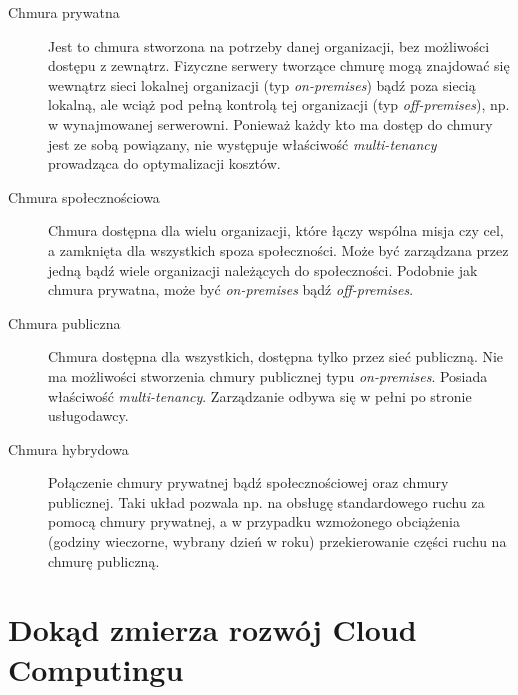 \documentclass[12pt,a4paper,twoside,titlepage,openright]{book}
\begin{document}
\begin{description}
\item [Chmura prywatna] Jest to chmura stworzona na potrzeby danej organizacji, bez możliwości dostępu z zewnątrz. Fizyczne serwery tworzące chmurę mogą znajdować się wewnątrz sieci lokalnej organizacji (typ \textit{on-premises}) bądź poza siecią lokalną, ale wciąż pod pełną kontrolą tej organizacji (typ \textit{off-premises}), np. w wynajmowanej serwerowni. Ponieważ każdy kto ma dostęp do chmury jest ze sobą powiązany, nie występuje właściwość \textit{multi-tenancy} prowadząca do optymalizacji kosztów.
\item [Chmura społecznościowa] Chmura dostępna dla wielu organizacji, które łączy wspólna misja czy cel, a zamknięta dla wszystkich spoza społeczności. Może być zarządzana przez jedną bądź wiele organizacji należących do społeczności. Podobnie jak chmura prywatna, może być \textit{on-premises} bądź \textit{off-premises}.
\item [Chmura publiczna] Chmura dostępna dla wszystkich, dostępna tylko przez sieć publiczną. Nie ma możliwości stworzenia chmury publicznej typu \textit{on-premises}. Posiada właściwość \textit{multi-tenancy}. Zarządzanie odbywa się w pełni po stronie usługodawcy.
\item [Chmura hybrydowa] Połączenie chmury prywatnej bądź społecznościowej oraz chmury publicznej. Taki układ pozwala np. na obsługę standardowego ruchu za pomocą chmury prywatnej, a w przypadku wzmożonego obciążenia (godziny wieczorne, wybrany dzień w roku) przekierowanie części ruchu na chmurę publiczną.
\end{description}

\section{Dokąd zmierza rozwój Cloud Computingu}
\end{document}
